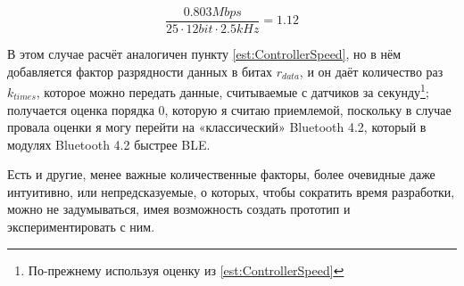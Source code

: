 \documentclass[a4paper, 10pt, final]{article} %
\begin{document}
\begin{enumerate}[label=\emph{(\arabic*)}]
\begin{figure}[H]
\begin{minipage}[b]{.35\linewidth}
                \end{minipage}
                \begin{minipage}[b]{.35\linewidth}
                    \centering
                    \[
                        \frac{0.803Mbps}{25 \cdot 12bit \cdot 2.5kHz} = 1.12
                    \]
                \end{minipage}
            \end{figure}
            \noindent В этом случае расчёт аналогичен пункту \ref{est:ControllerSpeed}, но в нём добавляется фактор разрядности данных в битах $r_{data}$, и он даёт количество раз $k_{times}$, которое можно передать данные, считываемые с датчиков за секунду\footnote{По-прежнему используя оценку из \ref{est:ControllerSpeed}}; получается оценка порядка $0$, которую я считаю приемлемой, поскольку в случае провала оценки я могу перейти на «классический» Bluetooth 4.2, который в модулях Bluetooth 4.2 быстрее BLE.
    \end{enumerate}
    \noindent Есть и другие, менее важные количественные факторы, более очевидные даже интуитивно, или непредсказуемые, о которых, чтобы сократить время разработки, можно не задумываться, имея возможность создать прототип и экспериментировать с ним.
\end{document}
